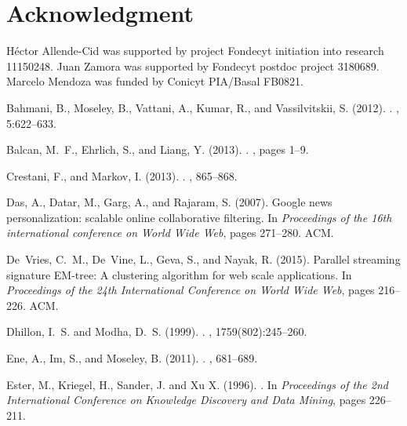 \documentclass[smallextended]{svjour3}       %
\begin{document}
\section{Acknowledgment}
H\'ector Allende-Cid was supported by project Fondecyt initiation into research 11150248.
Juan Zamora was supported by Fondecyt postdoc project 3180689.
Marcelo Mendoza was funded by Conicyt PIA/Basal FB0821.
\clearpage 


% 
\begin{thebibliography}{}

Bahmani, B., Moseley, B., Vattani, A., Kumar, R., and Vassilvitskii, S. (2012).
.
, 5:622--633.

Balcan, M.~F., Ehrlich, S., and Liang, Y. (2013).
.
, pages 1--9.

Crestani, F., and Markov, I. (2013).
.
, 865--868.

Das, A., Datar, M., Garg, A., and Rajaram, S. (2007).
\newblock Google news personalization: scalable online collaborative filtering.
\newblock In {\em Proceedings of the 16th international conference on World
  Wide Web}, pages 271--280. ACM.

De~Vries, C.~M., De~Vine, L., Geva, S., and Nayak, R. (2015).
\newblock Parallel streaming signature {EM}-tree: A clustering algorithm for web
  scale applications.
\newblock In {\em Proceedings of the 24th International Conference on World
  Wide Web}, pages 216--226. ACM.

Dhillon, I.~S. and Modha, D.~S. (1999).
.
, 1759(802):245--260.

Ene, A., Im, S., and Moseley, B. (2011).
.
, 681--689.

Ester, M., Kriegel, H., Sander, J. and Xu X. (1996). 
.
\newblock In {\em Proceedings of the 2nd International Conference on Knowledge Discovery and Data Mining}, pages 226--211.


\end{thebibliography}
\end{document}
